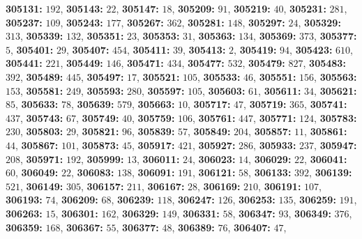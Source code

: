 \textsf{\bfseries 305131:} $192$, \textsf{\bfseries 305143:} $22$, \textsf{\bfseries 305147:} $18$, \textsf{\bfseries 305209:} $91$, \textsf{\bfseries 305219:} $40$, \textsf{\bfseries 305231:} $281$, \textsf{\bfseries 305237:} $109$, \textsf{\bfseries 305243:} $177$, \textsf{\bfseries 305267:} $362$, \textsf{\bfseries 305281:} $148$, \textsf{\bfseries 305297:} $24$, \textsf{\bfseries 305329:} $313$, \textsf{\bfseries 305339:} $132$, \textsf{\bfseries 305351:} $23$, \textsf{\bfseries 305353:} $31$, \textsf{\bfseries 305363:} $134$, \textsf{\bfseries 305369:} $373$, \textsf{\bfseries 305377:} $5$, \textsf{\bfseries 305401:} $29$, \textsf{\bfseries 305407:} $454$, \textsf{\bfseries 305411:} $39$, \textsf{\bfseries 305413:} $2$, \textsf{\bfseries 305419:} $94$, \textsf{\bfseries 305423:} $610$, \textsf{\bfseries 305441:} $221$, \textsf{\bfseries 305449:} $146$, \textsf{\bfseries 305471:} $434$, \textsf{\bfseries 305477:} $532$, \textsf{\bfseries 305479:} $827$, \textsf{\bfseries 305483:} $392$, \textsf{\bfseries 305489:} $445$, \textsf{\bfseries 305497:} $17$, \textsf{\bfseries 305521:} $105$, \textsf{\bfseries 305533:} $46$, \textsf{\bfseries 305551:} $156$, \textsf{\bfseries 305563:} $153$, \textsf{\bfseries 305581:} $249$, \textsf{\bfseries 305593:} $280$, \textsf{\bfseries 305597:} $105$, \textsf{\bfseries 305603:} $61$, \textsf{\bfseries 305611:} $34$, \textsf{\bfseries 305621:} $85$, \textsf{\bfseries 305633:} $78$, \textsf{\bfseries 305639:} $579$, \textsf{\bfseries 305663:} $10$, \textsf{\bfseries 305717:} $47$, \textsf{\bfseries 305719:} $365$, \textsf{\bfseries 305741:} $437$, \textsf{\bfseries 305743:} $67$, \textsf{\bfseries 305749:} $40$, \textsf{\bfseries 305759:} $106$, \textsf{\bfseries 305761:} $447$, \textsf{\bfseries 305771:} $124$, \textsf{\bfseries 305783:} $230$, \textsf{\bfseries 305803:} $29$, \textsf{\bfseries 305821:} $96$, \textsf{\bfseries 305839:} $57$, \textsf{\bfseries 305849:} $204$, \textsf{\bfseries 305857:} $11$, \textsf{\bfseries 305861:} $44$, \textsf{\bfseries 305867:} $101$, \textsf{\bfseries 305873:} $45$, \textsf{\bfseries 305917:} $421$, \textsf{\bfseries 305927:} $286$, \textsf{\bfseries 305933:} $237$, \textsf{\bfseries 305947:} $208$, \textsf{\bfseries 305971:} $192$, \textsf{\bfseries 305999:} $13$, \textsf{\bfseries 306011:} $24$, \textsf{\bfseries 306023:} $14$, \textsf{\bfseries 306029:} $22$, \textsf{\bfseries 306041:} $60$, \textsf{\bfseries 306049:} $22$, \textsf{\bfseries 306083:} $138$, \textsf{\bfseries 306091:} $191$, \textsf{\bfseries 306121:} $58$, \textsf{\bfseries 306133:} $392$, \textsf{\bfseries 306139:} $521$, \textsf{\bfseries 306149:} $305$, \textsf{\bfseries 306157:} $211$, \textsf{\bfseries 306167:} $28$, \textsf{\bfseries 306169:} $210$, \textsf{\bfseries 306191:} $107$, \textsf{\bfseries 306193:} $74$, \textsf{\bfseries 306209:} $68$, \textsf{\bfseries 306239:} $118$, \textsf{\bfseries 306247:} $126$, \textsf{\bfseries 306253:} $135$, \textsf{\bfseries 306259:} $191$, \textsf{\bfseries 306263:} $15$, \textsf{\bfseries 306301:} $162$, \textsf{\bfseries 306329:} $149$, \textsf{\bfseries 306331:} $58$, \textsf{\bfseries 306347:} $93$, \textsf{\bfseries 306349:} $376$, \textsf{\bfseries 306359:} $168$, \textsf{\bfseries 306367:} $55$, \textsf{\bfseries 306377:} $48$, \textsf{\bfseries 306389:} $76$, \textsf{\bfseries 306407:} $47$, 

